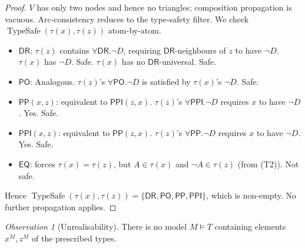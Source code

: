 \documentclass[11pt]{article}
\theoremstyle{definition}
\theoremstyle{remark}
\newtheorem{observation}[theorem]{Observation}
\newcommand{\DR}{\mathsf{DR}}
\newcommand{\PO}{\mathsf{PO}}
\newcommand{\PP}{\mathsf{PP}}
\newcommand{\PPI}{\mathsf{PPI}}
\newcommand{\EQ}{\mathsf{EQ}}
\newcommand{\RCC}{\{\DR,\PO,\PP,\PPI\}}
\newcommand{\TypeSafe}{\operatorname{TypeSafe}}
\begin{document}
\begin{proof}
$V$ has only two nodes and hence no triangles; composition
propagation is vacuous.  Arc-consistency reduces to the type-safety
filter.  We check $\TypeSafe(\tau(x), \tau(z))$ atom-by-atom.
\begin{itemize}
  \item $\DR$: $\tau(z)$ contains $\forall \DR. \neg D$, requiring
    $\DR$-neighbours of $z$ to have $\neg D$.  $\tau(x)$ has $\neg D$.
    Safe.  $\tau(x)$ has no $\DR$-universal.  Safe.
  \item $\PO$: Analogous.  $\tau(z)$'s $\forall \PO. \neg D$ is
    satisfied by $\tau(x)$'s $\neg D$.  Safe.
  \item $\PP(x, z)$: equivalent to $\PPI(z, x)$.  $\tau(z)$'s
    $\forall \PPI. \neg D$ requires $x$ to have $\neg D$.  Yes.  Safe.
  \item $\PPI(x, z)$: equivalent to $\PP(z, x)$.  $\tau(z)$'s
    $\forall \PP. \neg D$ requires $x$ to have $\neg D$.  Yes.  Safe.
  \item $\EQ$: forces $\tau(x) = \tau(z)$, but $A \in \tau(x)$ and
    $\neg A \in \tau(z)$ (from (T2)).  Not safe.
\end{itemize}
Hence $\TypeSafe(\tau(x), \tau(z)) = \RCC$, which is non-empty.  No
further propagation applies.
\end{proof}

\begin{observation}[Unrealisability]
\label{obs:unrealisable}
There is no model $M \models T$ containing elements $x^M, z^M$ of the
prescribed types.
\end{observation}
\end{document}
